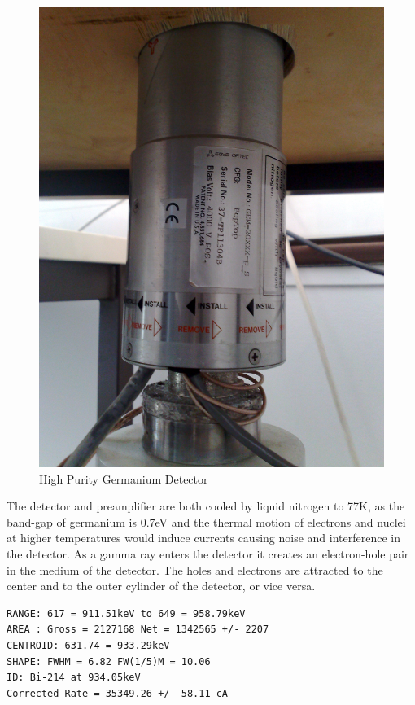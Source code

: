 \begin{figure}[htp]
  \begin{center}
    \includegraphics[scale=0.8]{chapters/activity_code/images/hpge.png}
    \caption{High Purity Germanium Detector}
    \label{fig:hpge}
  \end{center}
\end{figure}

The detector and preamplifier are both cooled by liquid nitrogen to 77K, as the band-gap of germanium is 0.7eV and the thermal motion of electrons and nuclei at higher temperatures would induce currents causing noise and interference in the detector.  As a gamma ray enters the detector it creates an electron-hole pair in the medium of the detector.  The holes and electrons are attracted to the center and to the outer cylinder of the detector, or vice versa.




\begin{lstlisting}[style=sMaestro,caption={Maestro 931KeV Peak Measurement},captionpos=b]
RANGE: 617 = 911.51keV to 649 = 958.79keV
AREA : Gross = 2127168 Net = 1342565 +/- 2207
CENTROID: 631.74 = 933.29keV
SHAPE: FWHM = 6.82 FW(1/5)M = 10.06
ID: Bi-214 at 934.05keV
Corrected Rate = 35349.26 +/- 58.11 cA
\end{lstlisting}

